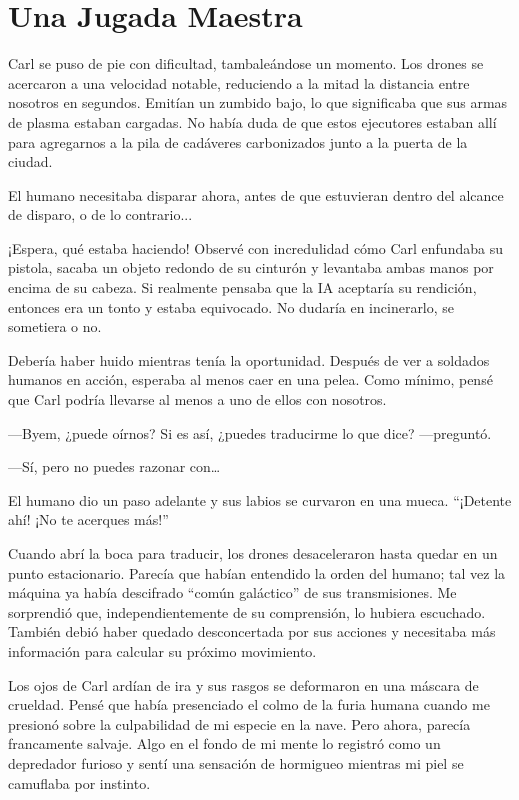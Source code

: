 \chapter{Una Jugada Maestra}

Carl se puso de pie con dificultad, tambaleándose un momento. Los drones se acercaron a una velocidad notable, reduciendo a la mitad la distancia entre nosotros en segundos. Emitían un zumbido bajo, lo que significaba que sus armas de plasma estaban cargadas. No había duda de que estos ejecutores estaban allí para agregarnos a la pila de cadáveres carbonizados junto a la puerta de la ciudad.

El humano necesitaba disparar ahora, antes de que estuvieran dentro del alcance de disparo, o de lo contrario...

¡Espera, qué estaba haciendo! Observé con incredulidad cómo Carl enfundaba su pistola, sacaba un objeto redondo de su cinturón y levantaba ambas manos por encima de su cabeza. Si realmente pensaba que la IA aceptaría su rendición, entonces era un tonto y estaba equivocado. No dudaría en incinerarlo, se sometiera o no.

Debería haber huido mientras tenía la oportunidad. Después de ver a soldados humanos en acción, esperaba al menos caer en una pelea. Como mínimo, pensé que Carl podría llevarse al menos a uno de ellos con nosotros.

—Byem, ¿puede oírnos? Si es así, ¿puedes traducirme lo que dice? —preguntó.

—Sí, pero no puedes razonar con…

El humano dio un paso adelante y sus labios se curvaron en una mueca. “¡Detente ahí! ¡No te acerques más!”

Cuando abrí la boca para traducir, los drones desaceleraron hasta quedar en un punto estacionario. Parecía que habían entendido la orden del humano; tal vez la máquina ya había descifrado “común galáctico” de sus transmisiones. Me sorprendió que, independientemente de su comprensión, lo hubiera escuchado. También debió haber quedado desconcertada por sus acciones y necesitaba más información para calcular su próximo movimiento.

Los ojos de Carl ardían de ira y sus rasgos se deformaron en una máscara de crueldad. Pensé que había presenciado el colmo de la furia humana cuando me presionó sobre la culpabilidad de mi especie en la nave. Pero ahora, parecía francamente salvaje. Algo en el fondo de mi mente lo registró como un depredador furioso y sentí una sensación de hormigueo mientras mi piel se camuflaba por instinto.

